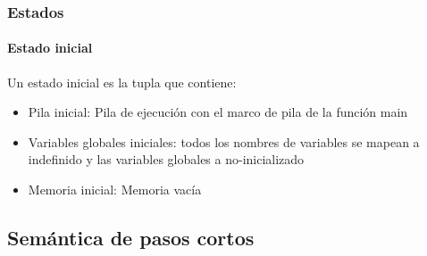 \begin{frame}
\frametitle{Estados}
\framesubtitle{Estado inicial}

Un estado inicial es la tupla que contiene:

\begin{itemize}
\item{Pila inicial: Pila de ejecución con el marco de pila de la función main}
\item{Variables globales iniciales: todos los nombres de variables se mapean a indefinido y las variables globales a no-inicializado}
\item{Memoria inicial: Memoria vacía}
\end{itemize}


\end{frame}


\subsection{Semántica de pasos cortos}


